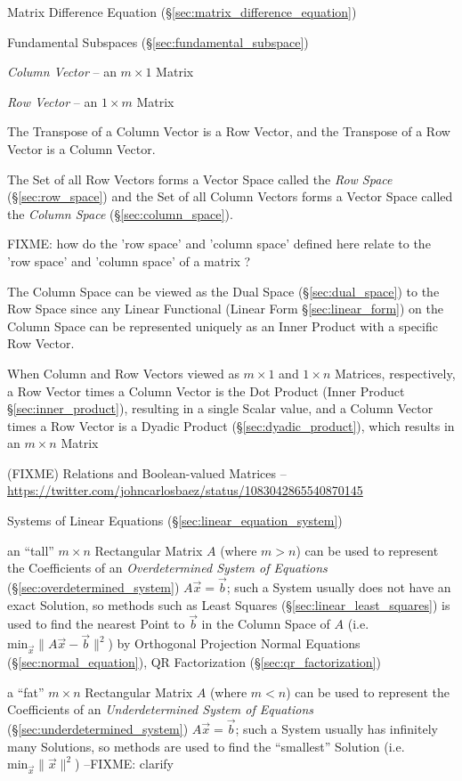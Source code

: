 \fist Matrix Difference Equation (\S\ref{sec:matrix_difference_equation})

\fist Fundamental Subspaces (\S\ref{sec:fundamental_subspace})

\emph{Column Vector} -- an $m \times 1$ Matrix

\emph{Row Vector} -- an $1 \times m$ Matrix

The Transpose of a Column Vector is a Row Vector, and the Transpose of a Row
Vector is a Column Vector.

The Set of all Row Vectors forms a Vector Space called the \emph{Row Space}
(\S\ref{sec:row_space}) and the Set of all Column Vectors forms a Vector Space
called the \emph{Column Space} (\S\ref{sec:column_space}).

FIXME: how do the 'row space' and 'column space' defined here relate to the
'row space' and 'column space' of a matrix ?

The Column Space can be viewed as the Dual Space (\S\ref{sec:dual_space}) to
the Row Space since any Linear Functional (Linear Form \S\ref{sec:linear_form})
on the Column Space can be represented uniquely as an Inner Product with a
specific Row Vector.

When Column and Row Vectors viewed as $m \times 1$ and $1 \times n$ Matrices,
respectively, a Row Vector times a Column Vector is the Dot Product
(Inner Product \S\ref{sec:inner_product}), resulting in a single Scalar value,
and a Column Vector times a Row Vector is a Dyadic Product
(\S\ref{sec:dyadic_product}), which results in an $m \times n$ Matrix

(FIXME) Relations and Boolean-valued Matrices --
\url{https://twitter.com/johncarlosbaez/status/1083042865540870145}


Systems of Linear Equations (\S\ref{sec:linear_equation_system})

an ``tall'' $m \times n$ Rectangular Matrix $A$ (where $m > n$) can be used to
represent the Coefficients of an \emph{Overdetermined System of Equations}
(\S\ref{sec:overdetermined_system}) $A\vec{x} = \vec{b}$; such a System usually
does not have an exact Solution, so methods such as Least Squares
(\S\ref{sec:linear_least_squares}) is used to find the nearest Point to
$\vec{b}$ in the Column Space of $A$ (i.e.  $\mathrm{min}_{\vec{x}} \|A\vec{x} -
\vec{b}\|^2$) by Orthogonal Projection \fist Normal Equations
(\S\ref{sec:normal_equation}), QR Factorization (\S\ref{sec:qr_factorization})

a ``fat'' $m \times n$ Rectangular Matrix $A$ (where $m < n$) can be used to
represent the Coefficients of an \emph{Underdetermined System of Equations}
(\S\ref{sec:underdetermined_system}) $A\vec{x} = \vec{b}$; such a System
usually has infinitely many Solutions, so methods are used to find the
``smallest'' Solution (i.e. $\mathrm{min}_{\vec{x}} \|\vec{x}\|^2$)
--FIXME: clarify

